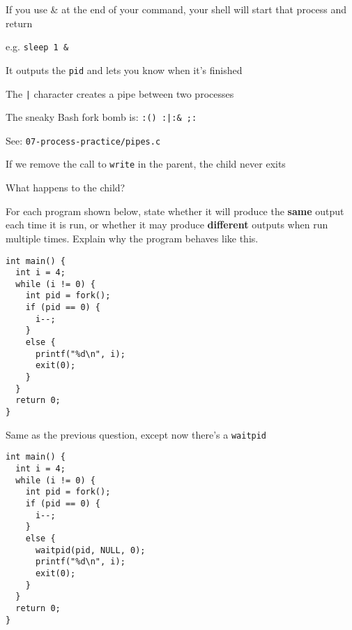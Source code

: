   \begin{slide}
    

    If you use \& at the end of your command, your shell will start that
    process and return

    \leftspace{}e.g. \texttt{sleep 1 &}
    \medskip

    It outputs the \texttt{pid} and lets you know when it's finished
    \medskip

    The \texttt{|} character creates a pipe between two processes
    \medskip

    The sneaky Bash fork bomb is: \texttt{:(){ :|:& };:}

  \end{slide}

  \begin{slide}
    

    See: \texttt{07-process-practice/pipes.c}
    \medskip

    If we remove the call to \texttt{write} in the parent, the child never exits
    \medskip

    What happens to the child?
  \end{slide}


  \begin{slide}
    

    For each program shown below, state whether it will produce the
    \textbf{same} output each time it is run, or whether it may produce
    \textbf{different} outputs when run multiple times.
    Explain why the program behaves like this.
    \medskip

    \begin{verbatim}
int main() {
  int i = 4;
  while (i != 0) {
    int pid = fork();
    if (pid == 0) {
      i--;
    }
    else {
      printf("%d\n", i);
      exit(0);
    }
  }
  return 0;
}
    \end{verbatim}
  \end{slide}

  \begin{slide}
    

    Same as the previous question, except now there's a \texttt{waitpid}
    \medskip

    \begin{verbatim}
int main() {
  int i = 4;
  while (i != 0) {
    int pid = fork();
    if (pid == 0) {
      i--;
    }
    else {
      waitpid(pid, NULL, 0);
      printf("%d\n", i);
      exit(0);
    }
  }
  return 0;
}
    \end{verbatim}
  \end{slide}


